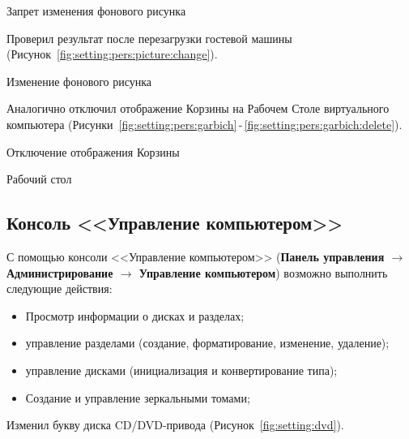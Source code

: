 \begin{image}
	\caption{Запрет изменения фонового рисунка}
	\label{fig:setting:pers:picture}
\end{image}

Проверил результат после перезагрузки гостевой машины
(Рисунок~\ref{fig:setting:pers:picture:change}).

\begin{image}
	\caption{Изменение фонового рисунка}
	\label{fig:setting:pers:picture:change}
\end{image}

Аналогично отключил отображение Корзины на Рабочем Столе
виртуального компьютера
(Рисунки~\ref{fig:setting:pers:garbich}\,-\,\ref{fig:setting:pers:garbich:delete}).

\begin{image}
	\caption{Отключение отображения Корзины}
	\label{fig:setting:pers:garbich}
\end{image}

\begin{image}
	\caption{Рабочий стол}
	\label{fig:setting:pers:garbich:delete}
\end{image}

\clearpage

\subsection{Консоль <<Управление компьютером>>}

С помощью консоли <<Управление компьютером>>
(\textbf{Панель управления $\rightarrow$ Администрирование
$\rightarrow$ Управление компьютером}) возможно выполнить следующие действия:

\begin{itemize}
	\item Просмотр информации о дисках и разделах;
	\item управление разделами (создание, форматирование, изменение, удаление);
	\item управление дисками (инициализация и конвертирование типа);
	\item Создание и управление зеркальными томами;
\end{itemize}

Изменил букву диска CD/DVD-привода (Рисунок~\ref{fig:setting:dvd}).

